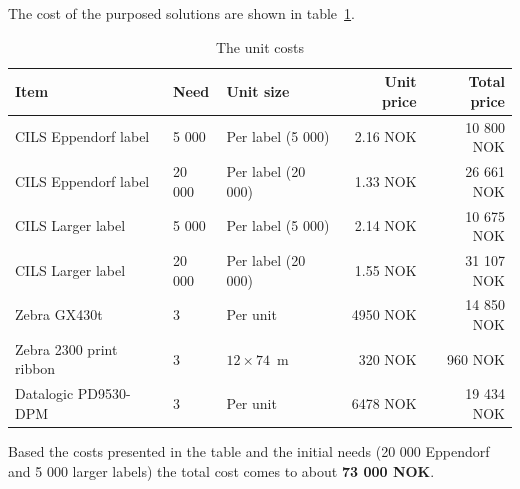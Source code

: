 \documentclass[a4paper,english, 11pt]{article}
\begin{document}
The cost of the purposed solutions are shown in table~\ref{tab:costs}.
\begin{table}[htb]
    \caption{\label{tab:costs}The unit costs}
    \begin{tabular}{lllrr}
        \hline
        \textbf{Item} & \textbf{Need} & \textbf{Unit size} & \textbf{Unit price} & \textbf{Total price} \\ \hline
        CILS Eppendorf label    & 5 000     & Per label  (5 000)    & 2.16 NOK  & 10 800 NOK\\ 
        CILS Eppendorf label    & 20 000    & Per label  (20 000)   & 1.33 NOK  & 26 661 NOK\\ 
        CILS Larger label       & 5 000     & Per label  (5 000)    & 2.14 NOK  & 10 675 NOK\\ 
        CILS Larger label       & 20 000    & Per label  (20 000)   & 1.55 NOK  & 31 107 NOK\\ 
        Zebra GX430t            & 3         & Per unit              & 4950 NOK  & 14 850 NOK\\ 
        Zebra 2300 print ribbon & 3         & $12\times74$~m         & 320 NOK   & 960 NOK\\ 
        Datalogic PD9530-DPM    & 3         & Per unit              & 6478 NOK  & 19 434 NOK\\ 
        \hline
    \end{tabular}
\end{table}


Based the costs presented in the table and the initial needs (20 000 Eppendorf and 5 000 larger labels) the total cost comes to about \textbf{73 000 NOK}.
\end{document}
